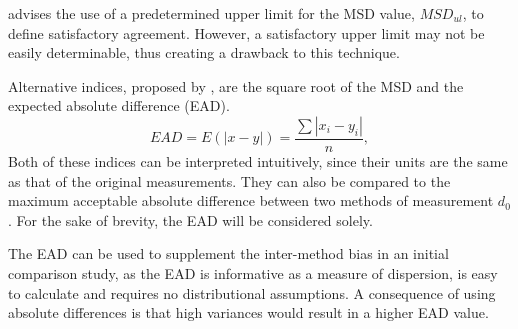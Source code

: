 \documentclass[12pt, a4paper]{report}
\theoremstyle{plain}
\theoremstyle{definition}
\theoremstyle{remark}
\begin{document}
\citet{Barnhart} advises the use of a predetermined upper limit
for the MSD value, $MSD_{ul}$, to define satisfactory agreement.
However, a satisfactory upper limit may not be easily
determinable, thus creating a drawback to this technique.


Alternative indices, proposed by \citet{Barnhart}, are the square root of the MSD and the expected absolute difference (EAD). 
\[
EAD = E(|x - y|) = \frac{\sum |x_{i}- y_{i}|}{n},
\]
Both of these indices can be interpreted intuitively, since their units are the same as that of the original measurements. They can also be compared to the maximum acceptable absolute difference between two methods of measurement $d_{0}$. For the sake of brevity, the EAD will be considered solely.

The EAD can be used to supplement the inter-method bias in an
initial comparison study, as the EAD is informative as a measure
of dispersion, is easy to calculate and requires no distributional
assumptions. A consequence of using absolute differences is that high variances would result in a higher EAD value. 

\end{document}
